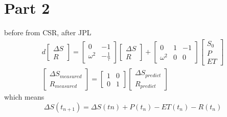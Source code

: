 \section{Part 2}
before from CSR, after JPL
\begin{gather*}
	d \begin{bmatrix}
		\Delta S\\
		R
	\end{bmatrix} = \begin{bmatrix}
	0 & -1 \\
	\omega^2 & -\frac{1}{\tau}
\end{bmatrix} \begin{bmatrix}
\Delta S\\
R
\end{bmatrix} + \begin{bmatrix}
0 & 1 & -1 \\
\omega^2 & 0 & 0
\end{bmatrix} \begin{bmatrix}
S_{0}\\
P\\
ET
\end{bmatrix} \\
\begin{bmatrix}
	\Delta S_{measured} \\
	R_{measured}
\end{bmatrix} = \begin{bmatrix}
1 & 0 \\
0 & 1
\end{bmatrix} \begin{bmatrix}
\Delta S_{predict} \\
R_{predict} 
\end{bmatrix} 
\end{gather*}
which means
\begin{equation*}
	\Delta S(t_{n+1}) = \Delta S(t{n}) + P(t_{n}) - ET(t_{n}) - R(t_{n})
\end{equation*}
